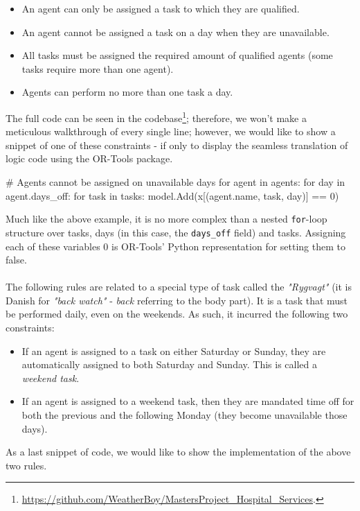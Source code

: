 \begin{itemize}
	\item An agent can only be assigned a task to which they are qualified.
	\item An agent cannot be assigned a task on a day when they are unavailable.
	\item All tasks must be assigned the required amount of qualified agents (some tasks require more than one agent).
	\item Agents can perform no more than one task a day.
\end{itemize}
The full code can be seen in the codebase\footnote{\href{https://github.com/WeatherBoy/MastersProject_Hospital_Services}{https://github.com/WeatherBoy/MastersProject\_Hospital\_Services}.}; therefore, we won't make a meticulous walkthrough of every single line; however, we would like to show a snippet of one of these constraints - if only to display the seamless translation of logic code using the OR-Tools package.
\begin{python}
# Agents cannot be assigned on unavailable days
for agent in agents:
    for day in agent.days_off:
        for task in tasks:
            model.Add(x[(agent.name, task, day)] == 0)
\end{python}
Much like the above example, it is no more complex than a nested \texttt{for}-loop structure over tasks, days (in this case, the \texttt{days_off} field) and tasks. Assigning each of these variables \(0\) is OR-Tools' Python representation for setting them to false.
\\
\\ 
The following rules are related to a special type of task called the \emph{"Rygvagt"} (it is Danish for \emph{"back watch"} - \emph{back} referring to the body part). It is a task that must be performed daily, even on the weekends. As such, it incurred the following two constraints:
\begin{itemize}
	\item If an agent is assigned to a task on either Saturday or Sunday, they are automatically assigned to both Saturday and Sunday. This is called a \emph{weekend task}.
	\item If an agent is assigned to a weekend task, then they are mandated time off for both the previous and the following Monday (they become unavailable those days).
\end{itemize}
As a last snippet of code, we would like to show the implementation of the above two rules.
